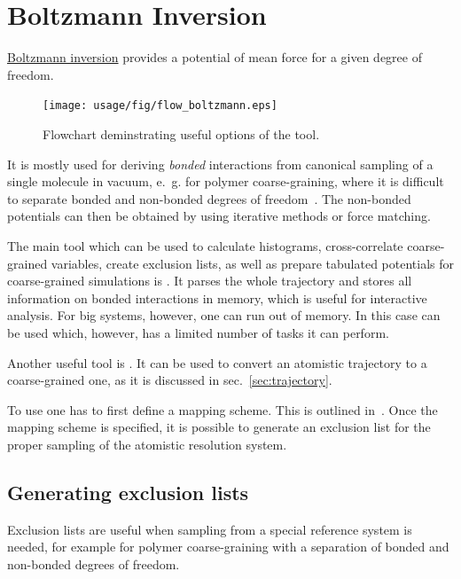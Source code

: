 \chapter{Boltzmann Inversion}

\hyperref[sec:bi]{Boltzmann inversion} provides a potential of mean force for a given degree of freedom. 
%
\begin{figure}
   \centering
   \texttt{[image: usage/fig/flow\_boltzmann.eps]}
   \caption{Flowchart deminstrating useful options of the tool.}
\end{figure}
%
It is mostly used for deriving {\em bonded} interactions from canonical sampling of a single molecule in vacuum, e.~g. for polymer coarse-graining, where it is difficult to separate bonded and non-bonded degrees of freedom~\cite{Tschoep:1998}. The non-bonded potentials can then be obtained by using iterative  methods or force matching.

The main tool which can be used to calculate histograms, cross-correlate coarse-grained variables, create exclusion lists, as well as prepare tabulated potentials for coarse-grained simulations is .  It parses the whole trajectory and stores all information on bonded interactions in memory, which is useful for interactive analysis. For big systems, however, one can run out of memory. In this case  can be used which, however, has a limited number of tasks it can perform.

Another useful tool is . It can be used to convert an atomistic trajectory to a coarse-grained one, as it is discussed in sec.~\ref{sec:trajectory}.

To use  one has to first define a mapping scheme. This is outlined in~. Once the mapping scheme is specified, it is possible to generate an exclusion list for the proper sampling of the atomistic resolution system. 

\section{Generating exclusion lists}
\label{sec:exclusions}
Exclusion lists are useful when sampling from a special reference system is needed, for example for polymer coarse-graining with a separation of bonded and non-bonded degrees of freedom.

